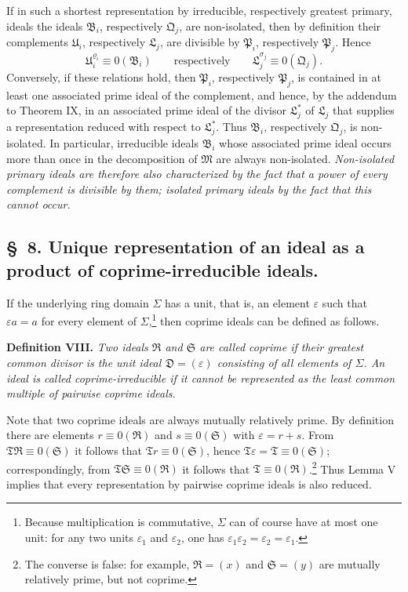\documentclass[11pt]{article}
\newcommand{\ideal}[1]{\mathfrak{#1}}
\begin{document}
If in such a shortest representation by irreducible, respectively greatest primary, ideals the ideals $\ideal B_i$, respectively $\ideal Q_j$, are non-isolated, then by definition their complements $\ideal U_i$, respectively $\ideal L_j$, are divisible by $\ideal P_i$, respectively $\ideal P_j$. Hence
\[
 \ideal U_i^{\varrho_i}\equiv0(\ideal B_i)
 \qquad \text{respectively} \qquad
 \ideal L_j^{\sigma_j}\equiv0(\ideal Q_j).
\]
Conversely, if these relations hold, then $\ideal P_i$, respectively $\ideal P_j$, is contained in at least one associated prime ideal of the complement, and hence, by the addendum to Theorem IX, in an associated prime ideal of the divisor $\ideal L_j^*$ of $\ideal L_j$ that supplies a representation reduced with respect to $\ideal L_j^*$. Thus $\ideal B_i$, respectively $\ideal Q_j$, is non-isolated. In particular, irreducible ideals $\ideal B_i$ whose associated prime ideal occurs more than once in the decomposition of $\ideal M$ are always non-isolated. \emph{Non-isolated primary ideals are therefore also characterized by the fact that a power of every complement is divisible by them; isolated primary ideals by the fact that this cannot occur.}

\subsection*{\S~8. Unique representation of an ideal as a product of coprime-irreducible ideals.}

If the underlying ring domain $\Sigma$ has a unit, that is, an element $\varepsilon$ such that $\varepsilon a=a$ for every element of $\Sigma$,\footnote{Because multiplication is commutative, $\Sigma$ can of course have at most one unit: for any two units $\varepsilon_1$ and $\varepsilon_2$, one has $\varepsilon_1\varepsilon_2=\varepsilon_2=\varepsilon_1$.} then coprime ideals can be defined as follows.

\textbf{Definition VIII.} \emph{Two ideals $\ideal R$ and $\ideal S$ are called coprime if their greatest common divisor is the unit ideal $\ideal D=(\varepsilon)$ consisting of all elements of $\Sigma$. An ideal is called coprime-irreducible if it cannot be represented as the least common multiple of pairwise coprime ideals.}

Note that two coprime ideals are always mutually relatively prime. By definition there are elements $r\equiv0(\ideal R)$ and $s\equiv0(\ideal S)$ with $\varepsilon=r+s$. From $\ideal T\ideal R\equiv0(\ideal S)$ it follows that $\ideal T r\equiv0(\ideal S)$, hence $\ideal T\varepsilon=\ideal T\equiv0(\ideal S)$; correspondingly, from $\ideal T\ideal S\equiv0(\ideal R)$ it follows that $\ideal T\equiv0(\ideal R)$.\footnote{The converse is false: for example, $\ideal R=(x)$ and $\ideal S=(y)$ are mutually relatively prime, but not coprime.} Thus Lemma V implies that every representation by pairwise coprime ideals is also reduced.
\end{document}
